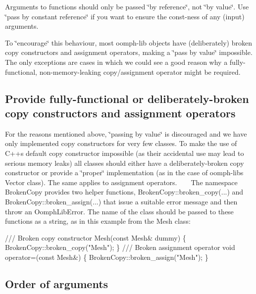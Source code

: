 \begin{DoxyItemize}
\item Arguments to functions should only be passed \char`\"{}by reference\char`\"{}, not \char`\"{}by value\char`\"{}. Use \char`\"{}pass by constant reference\char`\"{} if you want to ensure the const-\/ness of any (input) arguments.
\item To \char`\"{}encourage\char`\"{} this behaviour, most {\ttfamily oomph-\/lib} objects have (deliberately) broken copy constructors and assignment operators, making a \char`\"{}pass by value\char`\"{} impossible. The only exceptions are cases in which we could see a good reason why a fully-\/functional, non-\/memory-\/leaking copy/assignment operator might be required.
\end{DoxyItemize}\hypertarget{index_break_copy}{}\subsection{Provide fully-\/functional or deliberately-\/broken copy constructors and assignment operators}\label{index_break_copy}

\begin{DoxyItemize}
\item For the reasons mentioned above, \char`\"{}passing by value\char`\"{} is discouraged and we have only implemented copy constructors for very few classes. To make the use of C++\textquotesingle{}s default copy constructor impossible (as their accidental use may lead to serious memory leaks) all classes should either have a deliberately-\/broken copy constructor or provide a \char`\"{}proper\char`\"{} implementation (as in the case of {\ttfamily oomph-\/lib\textquotesingle{}s} {\ttfamily Vector} class). The same applies to assignment operators. ~\newline
 ~\newline
 The namespace {\ttfamily Broken\+Copy} provides two helper functions, {\ttfamily Broken\+Copy\+::broken\+\_\+copy}(...) and {\ttfamily Broken\+Copy\+::broken\+\_\+assign}(...) that issue a suitable error message and then throw an {\ttfamily Oomph\+Lib\+Error}. The name of the class should be passed to these functions as a string, as in this example from the {\ttfamily Mesh} class\+: ~\newline
~\newline

\begin{DoxyCode}
\textcolor{comment}{/// Broken copy constructor}
\textcolor{comment}{}Mesh(\textcolor{keyword}{const} Mesh& dummy) 
 \{ 
  BrokenCopy::broken\_copy(\textcolor{stringliteral}{"Mesh"});
 \} 
\textcolor{comment}{}
\textcolor{comment}{/// Broken assignment operator}
\textcolor{comment}{}\textcolor{keywordtype}{void} operator=(\textcolor{keyword}{const} Mesh&) 
 \{
  BrokenCopy::broken\_assign(\textcolor{stringliteral}{"Mesh"});
 \}
\end{DoxyCode}

\end{DoxyItemize}\hypertarget{index_order_of_args}{}\subsection{Order of arguments}\label{index_order_of_args}

